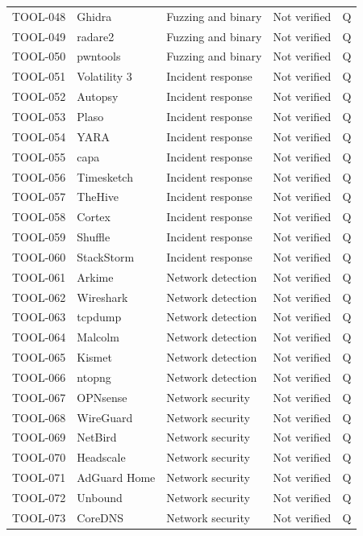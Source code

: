 \documentclass[11pt,oneside]{report}
\begin{document}
\begin{longtable}{P{0.10\textwidth}P{0.32\textwidth}P{0.22\textwidth}P{0.155\textwidth}P{0.055\textwidth}}
TOOL-048 & Ghidra & Fuzzing and binary & Not verified & Q \\
TOOL-049 & radare2 & Fuzzing and binary & Not verified & Q \\
TOOL-050 & pwntools & Fuzzing and binary & Not verified & Q \\
TOOL-051 & Volatility 3 & Incident response & Not verified & Q \\
TOOL-052 & Autopsy & Incident response & Not verified & Q \\
TOOL-053 & Plaso & Incident response & Not verified & Q \\
TOOL-054 & YARA & Incident response & Not verified & Q \\
TOOL-055 & capa & Incident response & Not verified & Q \\
TOOL-056 & Timesketch & Incident response & Not verified & Q \\
TOOL-057 & TheHive & Incident response & Not verified & Q \\
TOOL-058 & Cortex & Incident response & Not verified & Q \\
TOOL-059 & Shuffle & Incident response & Not verified & Q \\
TOOL-060 & StackStorm & Incident response & Not verified & Q \\
TOOL-061 & Arkime & Network detection & Not verified & Q \\
TOOL-062 & Wireshark & Network detection & Not verified & Q \\
TOOL-063 & tcpdump & Network detection & Not verified & Q \\
TOOL-064 & Malcolm & Network detection & Not verified & Q \\
TOOL-065 & Kismet & Network detection & Not verified & Q \\
TOOL-066 & ntopng & Network detection & Not verified & Q \\
TOOL-067 & OPNsense & Network security & Not verified & Q \\
TOOL-068 & WireGuard & Network security & Not verified & Q \\
TOOL-069 & NetBird & Network security & Not verified & Q \\
TOOL-070 & Headscale & Network security & Not verified & Q \\
TOOL-071 & AdGuard Home & Network security & Not verified & Q \\
TOOL-072 & Unbound & Network security & Not verified & Q \\
TOOL-073 & CoreDNS & Network security & Not verified & Q \\

\end{longtable}
\end{document}

